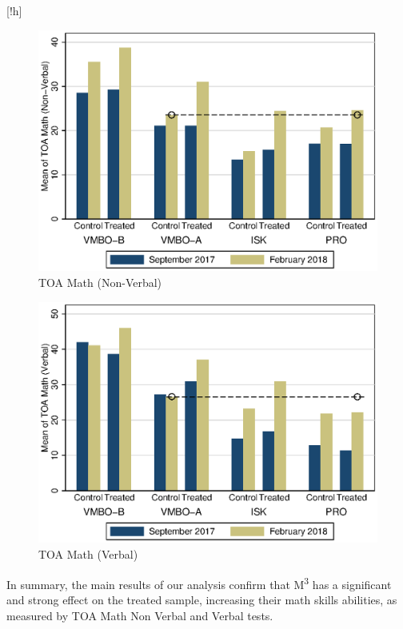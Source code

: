 \documentclass[ 12 pt]{article}
\makeatletter
\renewenvironment{figure}%
{\renewcommand\familydefault\sfdefault
	\@float{figure}}
{\end@float}
\makeatother
\begin{document}
\begin{figure}[!h]
\caption{Overview of treatment effect, by school program type)}
\begin{subfigure}{.5\textwidth}
  \centering
	\includegraphics[width=.8\linewidth]{bar_school4_line.eps}
  \caption{TOA Math (Non-Verbal)}
  \label{fig:barNV}
\end{subfigure}%
\begin{subfigure}{.5\textwidth}
  \centering
  \includegraphics[width=.8\linewidth]{bar_school4_line_VERBAL.eps}
  \caption{TOA Math (Verbal)}
	\label{fig:barVERB}
\end{subfigure}
\label{fig:bars}
\end{figure}

In summary, the main results of our analysis confirm that M\textsuperscript{3} has a significant and strong effect on the treated sample, increasing their math skills abilities, as measured by TOA Math Non Verbal and Verbal tests.
\end{document}
